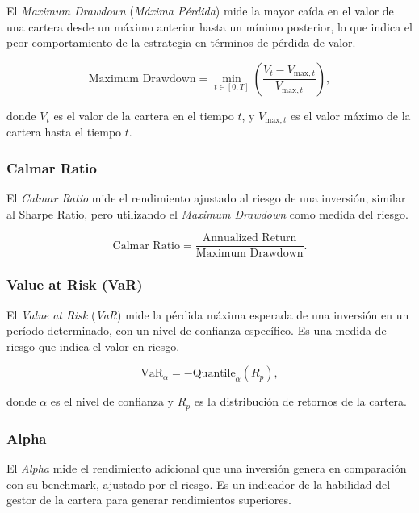 \documentclass[a4paper,12pt, twoside]{report}
\begin{document}
El \textit{Maximum Drawdown} (\textit{Máxima Pérdida}) mide la mayor caída en el valor de una cartera desde un máximo anterior hasta un mínimo posterior, lo que indica el peor comportamiento de la estrategia en términos de pérdida de valor.

\begin{equation}
\text{Maximum Drawdown} = \min_{t \in [0,T]} \left(\frac{V_t - V_{\text{max}, t}}{V_{\text{max}, t}}\right),
\end{equation}

donde $V_t$ es el valor de la cartera en el tiempo $t$, y $V_{\text{max}, t}$ es el valor máximo de la cartera hasta el tiempo $t$.

\subsubsection{Calmar Ratio}

El \textit{Calmar Ratio} mide el rendimiento ajustado al riesgo de una inversión, similar al Sharpe Ratio, pero utilizando el \textit{Maximum Drawdown} como medida del riesgo.

\begin{equation}
\text{Calmar Ratio} = \frac{\text{Annualized Return}}{\text{Maximum Drawdown}}.
\end{equation}

\subsubsection{Value at Risk (VaR)}

El \textit{Value at Risk} (\textit{VaR}) mide la pérdida máxima esperada de una inversión en un período determinado, con un nivel de confianza específico. Es una medida de riesgo que indica el valor en riesgo.

\begin{equation}
\text{VaR}_{\alpha} = -\text{Quantile}_\alpha (R_p),
\end{equation}

donde $\alpha$ es el nivel de confianza y $R_p$ es la distribución de retornos de la cartera.

\subsubsection{Alpha}

El \textit{Alpha} mide el rendimiento adicional que una inversión genera en comparación con su benchmark, ajustado por el riesgo. Es un indicador de la habilidad del gestor de la cartera para generar rendimientos superiores.
\end{document}
